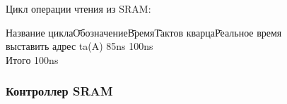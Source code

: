 Цикл операции чтения из SRAM:
\begin{tabbing}
Название цикла\qquad\=Обозначение\qquad\=Время\qquad\=Тактов кварца\qquad\=Реальное время\\
выставить адрес \> ta(A) \> 85ns  \> 100ns \\
Итого \> \>  \> 100ns \\
\end{tabbing}

\subsubsection{Контроллер SRAM}

\newpage
